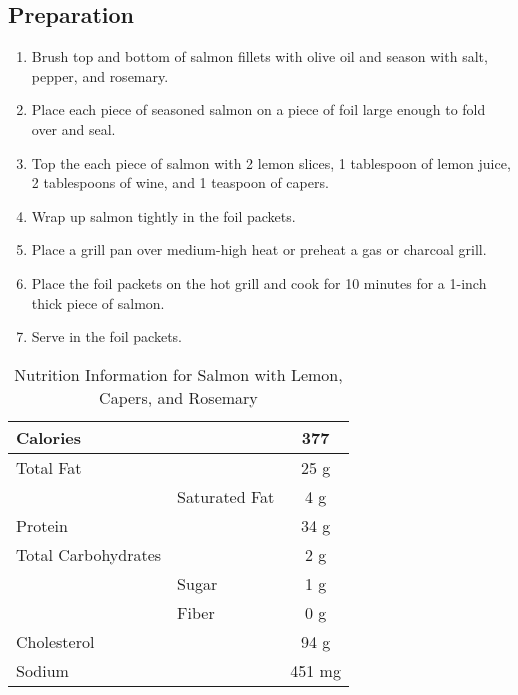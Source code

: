 \subsection{Preparation}
\begin{enumerate}
    \item Brush top and bottom of salmon fillets with olive oil and season with salt, pepper, and rosemary.
    \item Place each piece of seasoned salmon on a piece of foil large enough to fold over and seal.
    \item Top the each piece of salmon with 2 lemon slices, 1 tablespoon of lemon juice, 2 tablespoons
          of wine, and 1 teaspoon of capers.
    \item Wrap up salmon tightly in the foil packets.
    
    \item Place a grill pan over medium-high heat or preheat a gas or charcoal grill.
    \item Place the foil packets on the hot grill and cook for 10 minutes for a 1-inch thick piece of salmon.
    \item Serve in the foil packets.
\end{enumerate}

\begin{table}%
    \centering
    \begin{tabular}{|ll|c|}
        \hline
        Calories & & 377\\
        \hline
        Total Fat & & 25 g \\
        & Saturated Fat & 4 g\\
        \hline
        Protein & & 34 g\\
        \hline
        Total Carbohydrates & & 2 g\\
        & Sugar & 1 g\\
        & Fiber & 0 g\\
        \hline
        Cholesterol & & 94 g\\
        \hline
        Sodium & & 451 mg\\
        \hline
    \end{tabular}
    \caption{Nutrition Information for Salmon with Lemon, Capers, and Rosemary}
\end{table}
